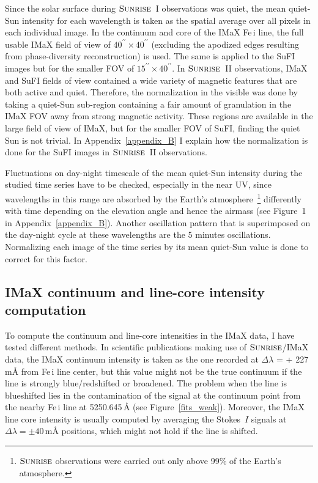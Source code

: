 \documentclass[goettingen, gauss, print]{thesis}
\begin{document}
Since the solar surface during $\textsc{Sunrise}$~I observations was quiet, the mean quiet-Sun intensity for each wavelength is taken as the spatial average over all pixels in each individual image.
In the continuum and core of the IMaX Fe\,{\sc i} line, the full usable IMaX field of view of $40^{\prime\prime}\times40^{\prime\prime}$ (excluding the apodized edges resulting from phase-diversity reconstruction) is used. The same is applied to the SuFI images but for the smaller FOV of $15^{\prime\prime}\times40^{\prime\prime}$. In $\textsc{Sunrise}$~II observations, IMaX and SuFI fields of view contained a wide variety of magnetic features that are both active and quiet. Therefore, the normalization in the visible was done by taking a quiet-Sun sub-region containing a fair amount of granulation in the IMaX FOV away from strong magnetic activity. These regions are available in the large field of view of IMaX, but for the smaller FOV of SuFI, finding the quiet Sun is not trivial. In Appendix~\ref{appendix_B} I explain how the normalization is done for the SuFI images in $\textsc{Sunrise}$~II observations.

Fluctuations on day-night timescale of the mean quiet-Sun intensity during the studied time series have to be checked, especially in the near UV, since wavelengths in this range are absorbed by the Earth's atmosphere~\footnote{$\textsc{Sunrise}$ observations were carried out only above 99\% of the Earth's atmosphere.} differently with time depending on the elevation angle and hence the airmass (see Figure~1 in Appendix~\ref{appendix_B}). Another oscillation pattern that is superimposed on the day-night cycle at these wavelengths are the 5 minutes oscillations. Normalizing each image of the time series by its mean quiet-Sun value is done to correct for this factor.

\subsection{IMaX continuum and line-core intensity computation} 

To compute the continuum and line-core intensities in the IMaX data, I have tested different methods. In scientific publications making use of $\textsc{Sunrise}$/IMaX data, the IMaX continuum intensity is taken as the one recorded at $\Delta \lambda$ = + 227\,m\AA{} from Fe\,{\sc i} line center, but this value might not be the true continuum if the line is strongly blue/redshifted or broadened. The problem when the line is blueshifted lies in the contamination of the signal at the continuum point from the nearby Fe\,{\sc i} line at 5250.645\,\AA{} (see Figure~\ref{fits_weak}).
Moreover, the IMaX line core intensity is usually computed by averaging the Stokes~$I$ signals at $\Delta \lambda = \pm 40$\,m\AA{} positions, which might not hold if the line is shifted.
\end{document}
